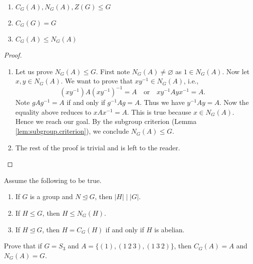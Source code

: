 \documentclass[11pt,a4paper]{article}
\begin{document}
\begin{prop}\hfill\null
    \begin{enumerate}[label=(\roman*)]
        \item \(C_G(A) , N_G(A), Z(G) \leq G\)
        \item \(C_G(G) = G\)
        \item \(C_G(A)\leq N_G(A)\)
    \end{enumerate}
\end{prop}

\begin{proof}
\begin{enumerate}[label=(\roman*)]
    \item Let us prove \(N_G(A) \leq G\).
    First note \(N_G(A)\neq \varnothing\) as \(1\in N_G(A)\).
    Now let \(x,y\in N_G(A)\).
    We want to prove that \(xy^{-1}\in N_G(A)\), i.e., 
    \[(xy^{-1})A(xy^{-1})^{-1} = A\quad\text{or}\quad xy^{-1}Ayx^{-1} = A.\]
    Note \(gAg^{-1} = A\) if and only if \(g^{-1}Ag=A\).
    Thus we have \(y^{-1}Ay = A\).
    Now the equality above reduces to 
    \(xAx^{-1}=A\). This is  true because \(x\in N_G(A)\).
    Hence we reach our goal.
    By the subgroup criterion (Lemma \ref{lem:subgroup.criterion}), we conclude \(N_G(A)\leq G\).


    \item The rest of the proof is trivial and is left to the reader.
\end{enumerate}
\end{proof}

\begin{eje}[Classwork]
    Assume the following to be true.
\begin{enumerate}[label=(\roman*)]
    \item If $G$ is a group and $N \trianglelefteq G$, then $|H| \mid |G|$.
    \item If $H \leq G$, then $H \leq N_G(H)$.
    \item If $H \trianglelefteq G$, then $H = C_G(H)$ if and only if $H$ is abelian.
\end{enumerate}
Prove that if $G = S_3$ and $A = \{(1), (1\ 2\ 3), (1\ 3\ 2)\}$, then $C_G(A) = A$ and $N_G(A) = G$.
\end{eje}
\end{document}
